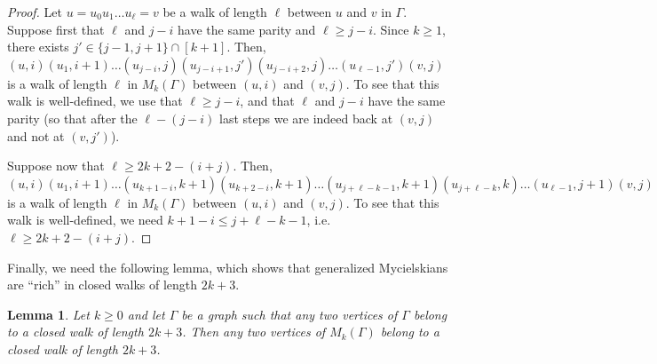 \documentclass{article}
\newtheorem{lemma}[theorem]{Lemma}
\begin{document}
\begin{proof}
    Let $u = u_0 u_1 \ldots u_{\ell} = v$ be a walk of length $\ell$ between $u$ and $v$ in $\Gamma$.
    Suppose first that $\ell$ and $j-i$ have the same parity and $\ell \geq j-i$.
    Since $k \geq 1$, there exists $j' \in \{j-1, j+1\} \cap [k+1]$.
    Then, $(u, i)(u_1, i+1) \ldots(u_{j-i}, j)(u_{j-i+1}, j')(u_{j-i+2}, j)\ldots(u_{\ell-1}, j')(v, j)$ is a walk of length $\ell$ in $M_k(\Gamma)$ between $(u, i)$ and $(v, j)$. To see that this walk is well-defined, we use that $\ell \geq j-i$, and that $\ell$ and $j-i$ have the same parity (so that after the $\ell - (j-i)$ last steps we are indeed back at $(v, j)$ and not at $(v, j')$).

    Suppose now that $\ell \geq 2k+2-(i+j)$.
    Then, $(u, i)(u_1, i+1)\ldots(u_{k+1-i}, k+1)(u_{k+2-i}, k+1)\ldots(u_{j+\ell-k-1}, k+1)(u_{j+\ell-k}, k)\ldots(u_{\ell-1}, j+1)(v, j)$ is a walk of length $\ell$ in $M_k(\Gamma)$ between $(u, i)$ and $(v, j)$. 
    To see that this walk is well-defined, we need $k+1-i \leq j+\ell - k - 1$, i.e. $\ell \geq 2k+2-(i+j)$.
\end{proof}
Finally, we need the following lemma, which shows that generalized Mycielskians are ``rich'' in closed walks of length $2k+3$.
\begin{lemma}\label{lem:exists-closed-walk-Myc}
    Let $k \geq 0$ and let $\Gamma$ be a graph such that any two vertices of $\Gamma$ belong to a closed walk of length $2k+3$.
    Then any two vertices of $M_k(\Gamma)$ belong to a closed walk of length $2k+3$.
\end{lemma}
\end{document}
